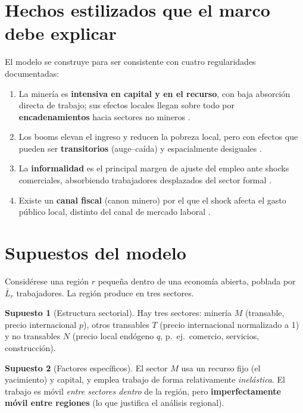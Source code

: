 \documentclass[11pt]{article}
\theoremstyle{definition}
\newtheorem{supuesto}{Supuesto}
\theoremstyle{plain}
\begin{document}
\section{Hechos estilizados que el marco debe explicar}
El modelo se construye para ser consistente con cuatro regularidades documentadas:
\begin{enumerate}[label=(E\arabic*), leftmargin=2.2em, itemsep=1pt]
  \item La minería es \textbf{intensiva en capital y en el recurso}, con baja absorción directa
  de trabajo; sus efectos locales llegan sobre todo por \textbf{encadenamientos} hacia sectores
  no mineros \citep{aragon2013}.
  \item Los booms elevan el ingreso y reducen la pobreza local, pero con efectos que pueden ser
  \textbf{transitorios} (auge--caída) y espacialmente desiguales \citep{aragon2020,loayza2016}.
  \item La \textbf{informalidad} es el principal margen de ajuste del empleo ante shocks
  comerciales, absorbiendo trabajadores desplazados del sector formal \citep{dixcarneiro2017}.
  \item Existe un \textbf{canal fiscal} (canon minero) por el que el shock afecta el gasto
  público local, distinto del canal de mercado laboral \citep{loayza2016}.
\end{enumerate}

\section{Supuestos del modelo}

Considérese una región $r$ pequeña dentro de una economía abierta, poblada por $\bar{L}_r$
trabajadores. La región produce en tres sectores.

\begin{supuesto}[Estructura sectorial]\label{sup:sectores}
Hay tres sectores: minería $M$ (transable, precio internacional $p$), otros transables $T$
(precio internacional normalizado a 1) y no transables $N$ (precio local endógeno $q$, p.\ ej.\
comercio, servicios, construcción).
\end{supuesto}

\begin{supuesto}[Factores específicos]\label{sup:factores}
El sector $M$ usa un recurso fijo (el yacimiento) y capital, y emplea trabajo de forma
relativamente \emph{inelástica}. El trabajo es móvil \emph{entre sectores dentro} de la región,
pero \textbf{imperfectamente móvil entre regiones} (lo que justifica el análisis regional).
\end{supuesto}
\end{document}
